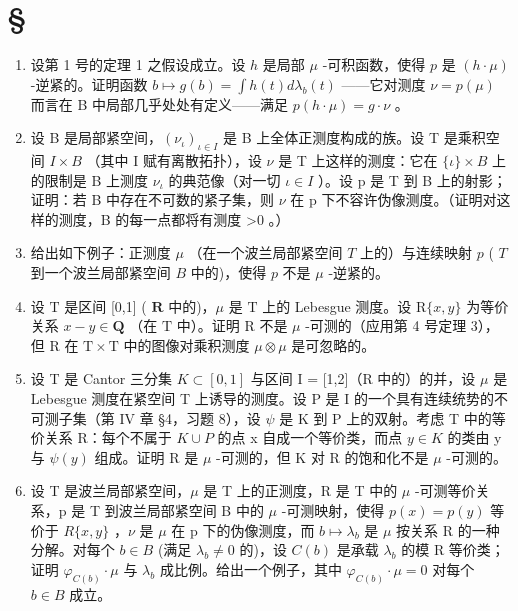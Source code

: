 \section*{\texorpdfstring{\S\CurrentExerciseGroup}{第{\CurrentExerciseGroup}节}}
{}

\begin{enumerate}
\def\labelenumi{\arabic{enumi})}
\item
  设第 1 号的定理 1 之假设成立。设 \(h\) 是局部 \(\mu\) -可积函数，使得 \(p\) 是 \((h \cdot \mu)\) -逆紧的。证明函数 \(b \mapsto g(b) = \int h(t) d\lambda_b(t)\) ——它对测度 \(\nu = p(\mu)\) 而言在 B 中局部几乎处处有定义——满足 \(p(h \cdot \mu) = g \cdot \nu\) 。
\item
  设 B 是局部紧空间，\((\nu_{\iota})_{\iota\in I}\) 是 B 上全体正测度构成的族。设 T 是乘积空间 \(I\times B\) （其中 I 赋有离散拓扑），设 \(\nu\) 是 T 上这样的测度：它在 \(\{\iota\}\times B\) 上的限制是 B 上测度 \(\nu_{\iota}\) 的典范像（对一切 \(\iota\in I\) ）。设 p 是 T 到 B 上的射影；证明：若 B 中存在不可数的紧子集，则 \(\nu\) 在 p 下不容许伪像测度。（证明对这样的测度，B 的每一点都将有测度 \textgreater0 。）
\item
  给出如下例子：正测度 \(\mu\) （在一个波兰局部紧空间 \(T\) 上的）与连续映射 \(p\) ( \(T\) 到一个波兰局部紧空间 \(B\) 中的)，使得 \(p\) 不是 \(\mu\) -逆紧的。
\item
  设 \(\mathrm{T}\) 是区间 {[}0,1{]} ( \(\mathbf{R}\) 中的)，\(\mu\) 是 \(\mathrm{T}\) 上的 Lebesgue 测度。设 \(\mathrm{R}\{x,y\}\) 为等价关系 \(x - y \in \mathbf{Q}\) （在 \(\mathrm{T}\) 中）。证明 \(\mathrm{R}\) 不是 \(\mu\) -可测的（应用第 4 号定理 3），但 \(\mathrm{R}\) 在 \(\mathrm{T} \times \mathrm{T}\) 中的图像对乘积测度 \(\mu \otimes \mu\) 是可忽略的。
\item
  设 T 是 Cantor 三分集 \(K \subset [0,1]\) 与区间 I = {[}1,2{]}（R 中的）的并，设 \(\mu\) 是 Lebesgue 测度在紧空间 T 上诱导的测度。设 P 是 I 的一个具有连续统势的不可测子集（第 IV 章 §4，习题 8），设 \(\psi\) 是 K 到 P 上的双射。考虑 T 中的等价关系 R：每个不属于 \(K \cup P\) 的点 x 自成一个等价类，而点 \(y \in K\) 的类由 y 与 \(\psi(y)\) 组成。证明 R 是 \(\mu\) -可测的，但 K 对 R 的饱和化不是 \(\mu\) -可测的。
\item
  设 T 是波兰局部紧空间，\(\mu\) 是 T 上的正测度，R 是 T 中的 \(\mu\) -可测等价关系，p 是 T 到波兰局部紧空间 B 中的 \(\mu\) -可测映射，使得 \(p(x) = p(y)\) 等价于 \(R\{x, y\}\) ，\(\nu\) 是 \(\mu\) 在 p 下的伪像测度，而 \(b \mapsto \lambda_b\) 是 \(\mu\) 按关系 R 的一种分解。对每个 \(b \in B\) (满足 \(\lambda_b \neq 0\) 的)，设 \(C(b)\) 是承载 \(\lambda_b\) 的模 R 等价类；证明 \(\varphi_{C(b)} \cdot \mu\) 与 \(\lambda_b\) 成比例。给出一个例子，其中 \(\varphi_{C(b)} \cdot \mu = 0\) 对每个 \(b \in B\) 成立。

\end{enumerate}

